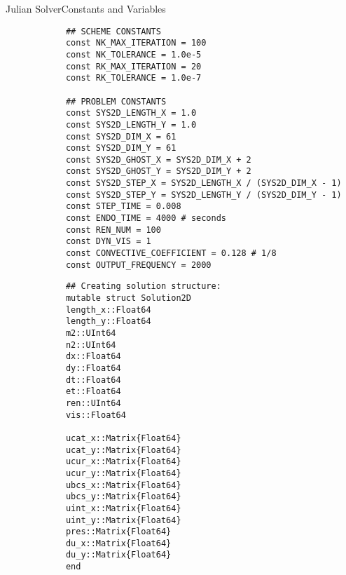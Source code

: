 \documentclass[\string~/GitHub/sthlmNordBeamerTheme/sthlmNordLightDemo.tex]{subfiles}
\begin{document}
\begin{frame}{Julian Solver}{Constants and Variables}
    
    \begin{center}
        \begin{verbatim}
            ## SCHEME CONSTANTS
            const NK_MAX_ITERATION = 100
            const NK_TOLERANCE = 1.0e-5
            const RK_MAX_ITERATION = 20
            const RK_TOLERANCE = 1.0e-7

            ## PROBLEM CONSTANTS
            const SYS2D_LENGTH_X = 1.0
            const SYS2D_LENGTH_Y = 1.0
            const SYS2D_DIM_X = 61 
            const SYS2D_DIM_Y = 61
            const SYS2D_GHOST_X = SYS2D_DIM_X + 2
            const SYS2D_GHOST_Y = SYS2D_DIM_Y + 2
            const SYS2D_STEP_X = SYS2D_LENGTH_X / (SYS2D_DIM_X - 1)
            const SYS2D_STEP_Y = SYS2D_LENGTH_Y / (SYS2D_DIM_Y - 1)
            const STEP_TIME = 0.008
            const ENDO_TIME = 4000 # seconds
            const REN_NUM = 100
            const DYN_VIS = 1
            const CONVECTIVE_COEFFICIENT = 0.128 # 1/8
            const OUTPUT_FREQUENCY = 2000
        \end{verbatim}
    \end{center}
		
	\framebreak
 
    \begin{center}
        \begin{verbatim}
            ## Creating solution structure:
            mutable struct Solution2D
            length_x::Float64
            length_y::Float64
            m2::UInt64
            n2::UInt64
            dx::Float64
            dy::Float64
            dt::Float64
            et::Float64
            ren::UInt64
            vis::Float64

            ucat_x::Matrix{Float64}
            ucat_y::Matrix{Float64}
            ucur_x::Matrix{Float64}
            ucur_y::Matrix{Float64}
            ubcs_x::Matrix{Float64}
            ubcs_y::Matrix{Float64}
            uint_x::Matrix{Float64}
            uint_y::Matrix{Float64}
            pres::Matrix{Float64}
            du_x::Matrix{Float64}
            du_y::Matrix{Float64}
            end
        \end{verbatim}
    \end{center}
    
\end{frame}
\end{document}
